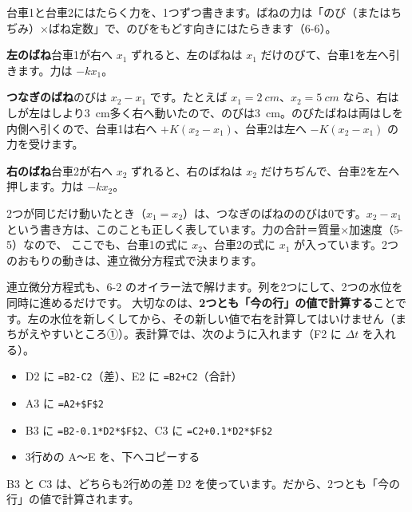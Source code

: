 台車1と台車2にはたらく力を、1つずつ書きます。ばねの力は「のび（またはちぢみ）×ばね定数」で、のびをもどす向きにはたらきます（6-6）。
\begin{enumerate}[label={\bkcircled[\bkTT]{\arabic*}}, leftmargin=2.4\zw, itemsep=2pt, topsep=2pt]
\item \textbf{左のばね}\quad 台車1が右へ $x_1$ ずれると、左のばねは $x_1$ だけのびて、台車1を左へ引きます。力は $-kx_1$。
\item \textbf{つなぎのばね}\quad のびは $x_2-x_1$ です。たとえば $x_1=\qty{2}{cm}$、$x_2=\qty{5}{cm}$ なら、右はしが左はしより\qty{3}{cm}多く右へ動いたので、のびは\qty{3}{cm}。のびたばねは両はしを内側へ引くので、台車1は右へ $+K(x_2-x_1)$、台車2は左へ $-K(x_2-x_1)$ の力を受けます。
\item \textbf{右のばね}\quad 台車2が右へ $x_2$ ずれると、右のばねは $x_2$ だけちぢんで、台車2を左へ押します。力は $-kx_2$。
\end{enumerate}
2つが同じだけ動いたとき（$x_1=x_2$）は、つなぎのばねののびは0です。$x_2-x_1$ という書き方は、このことも正しく表しています。力の合計＝質量×加速度（5-5）なので、
ここでも、台車1の式に $x_2$、台車2の式に $x_1$ が入っています。2つのおもりの動きは、連立微分方程式で決まります。



\label{bk:6-14:hyou}連立微分方程式も、6-2 のオイラー法で解けます。列を2つにして、2つの水位を同時に進めるだけです。
大切なのは、\textbf{2つとも「今の行」の値で計算する}ことです。左の水位を新しくしてから、その新しい値で右を計算してはいけません（まちがえやすいところ①）。表計算では、次のように入れます（F2 に $\Delta t$ を入れる）。
\begin{itemize}[leftmargin=1.2\zw, itemsep=1pt, topsep=2pt, label={\color{\bkTT}●}]
\item D2 に \texttt{=B2-C2}（差）、E2 に \texttt{=B2+C2}（合計）
\item A3 に \texttt{=A2+\$F\$2}
\item B3 に \texttt{=B2-0.1*D2*\$F\$2}、C3 に \texttt{=C2+0.1*D2*\$F\$2}
\item 3行めの A〜E を、下へコピーする
\end{itemize}
B3 と C3 は、どちらも2行めの差 D2 を使っています。だから、2つとも「今の行」の値で計算されます。

